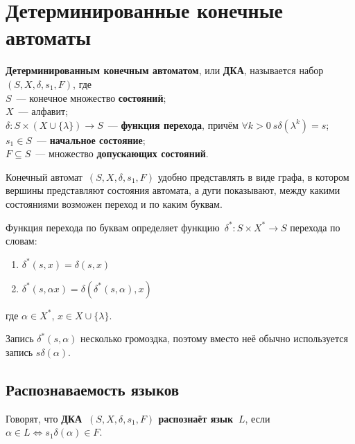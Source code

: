\section{Детерминированные конечные автоматы}
  \textbf{Детерминированным конечным автоматом}, или \textbf{ДКА}, называется набор~$(S, X, \delta, s_1, F)$, где\\
$S$~--- конечное множество \textbf{состояний};\\
$X$~--- алфавит;\\
$\delta \colon S \times (X \cup \{ \lambda \}) \to S$~--- \textbf{функция перехода}, причём $\forall k > 0 \ s \delta(\lambda^k) = s$;\\
$s_1 \in S$~--- \textbf{начальное состояние};\\
$F \subseteq S$~--- множество \textbf{допускающих состояний}.

Конечный автомат~$(S, X, \delta, s_1, F)$ удобно представлять в виде графа, в котором вершины представляют состояния автомата, а дуги показывают, между какими состояниями возможен переход и по каким буквам.

Функция перехода по буквам определяет функцию~$\delta^* \colon S \times X^* \to S$ перехода по словам:
\begin{enumerate}
	\item $\delta^*(s, x) = \delta(s, x)$
	\item $\delta^*(s, \alpha x) = \delta(\delta^*(s, \alpha), x)$
\end{enumerate}
где $\alpha \in X^*$, $x \in X \cup \{ \lambda \}$.

Запись $\delta^*(s, \alpha)$ несколько громоздка, поэтому вместо неё обычно используется запись $s \delta(\alpha)$.

\subsection{Распознаваемость языков}
Говорят, что \textbf{ДКА~$(S, X, \delta, s_1, F)$ распознаёт язык~$L$}, если $\alpha \in L \Leftrightarrow s_1 \delta(\alpha) \in F$.

